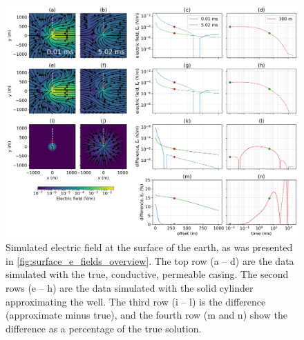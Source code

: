 \begin{figure}
    \begin{center}
    \includegraphics[width=\textwidth]{figures/em_casing/surface_e_fields_approx_permeable.png}
    \end{center}
\caption{
    Simulated electric field at the surface of the earth, as was presented in \ref{fig:surface_e_fields_overview}.
    The top row (a -- d) are the data simulated with the true, conductive, permeable casing.
    The second rows (e -- h) are the data
    simulated with the solid cylinder approximating the well.
    The third row (i -- l) is the difference (approximate minus true),
    and the fourth row (m and n) show the difference as a percentage of the true solution.
}
\label{fig:surface_e_fields_approx_permeable}
\end{figure}




